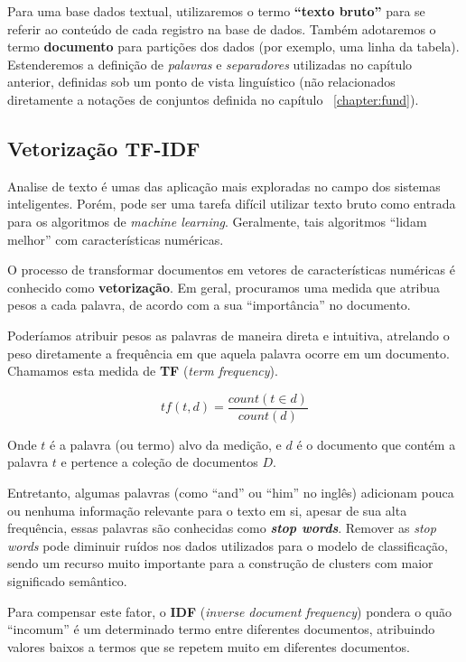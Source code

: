  Para uma base dados textual,  utilizaremos o termo \textbf{``texto bruto''}  para se referir ao conteúdo de cada registro na base de dados. 
 Também adotaremos o termo \textbf{documento} para partições dos dados (por exemplo, uma linha da tabela).
 Estenderemos a definição de \emph{palavras} e \emph{separadores} utilizadas no capítulo anterior, definidas sob um ponto de vista linguístico (não relacionados diretamente a notações de conjuntos definida no capítulo ~\ref{chapter:fund}).
 
 \subsection{Vetorização TF-IDF}
Analise de texto é umas das aplicação mais exploradas no campo dos sistemas inteligentes.
Porém, pode ser uma tarefa difícil utilizar texto bruto como entrada para os algoritmos de \emph{machine learning}. 
Geralmente, tais algoritmos ``lidam melhor'' com características numéricas.
 
O processo de transformar documentos em vetores de características numéricas é conhecido como \textbf{vetorização}. 
Em geral, procuramos uma medida que atribua pesos a cada palavra, de acordo com a sua ``importância'' no documento.

Poderíamos atribuir pesos as palavras de maneira direta e intuitiva, atrelando o peso diretamente a frequência em que aquela palavra ocorre em um documento.
Chamamos esta medida de \textbf{TF} (\emph{term frequency}).

\begin{equation}\label{eq:tf}
tf(t, d) = \frac{count(t \in d)}{count(d)}
\end{equation}

Onde $t$ é a palavra (ou termo) alvo da medição, e $d$ é o documento que contém a palavra $t$  e pertence a coleção de documentos $D$.

Entretanto, algumas palavras (como ``and'' ou ``him'' no inglês) adicionam pouca ou nenhuma informação relevante para o texto em si, apesar de sua alta frequência, essas palavras são conhecidas como \textbf{\emph{stop words}}.
Remover as \emph{stop words} pode diminuir ruídos nos dados utilizados para o modelo de classificação, sendo um recurso muito importante para a construção de clusters com maior significado semântico.

Para compensar este fator, o \textbf{IDF} (\emph{inverse document frequency}) pondera o quão ``incomum'' é um determinado termo entre diferentes documentos, atribuindo valores baixos a termos que se repetem muito em diferentes documentos.

